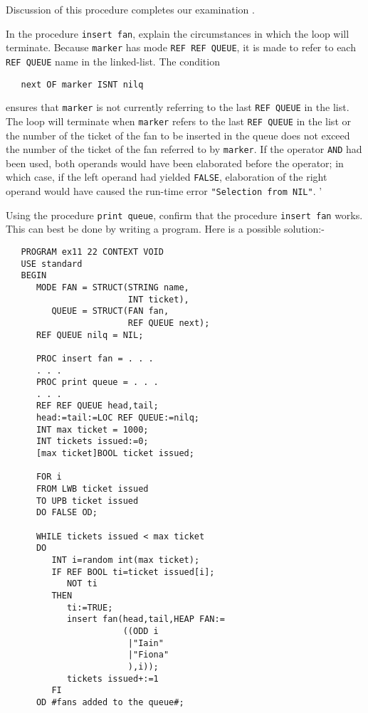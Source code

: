 Discussion of this procedure completes our examination
 .
\begin{exercise}
\item In the procedure \verb|insert fan|, explain the circumstances
in which the loop will terminate. \ans Because \verb|marker| has mode
\verb|REF REF QUEUE|, it is made to refer to each \verb|REF QUEUE|
name in the linked-list. The condition
\begin{verbatim}
   next OF marker ISNT nilq
\end{verbatim}
\noindent
ensures that \verb|marker| is not currently referring to the last
\verb|REF QUEUE| in the list. The loop will terminate when
\verb|marker| refers to the last \verb|REF QUEUE| in the list or the
number of the ticket of the fan to be inserted in the queue does not
exceed the number of the ticket of the fan referred to by
\verb|marker|.
\medskip
If the operator \verb|AND| had been used, both operands would have been
elaborated before the operator; in which case, if the left operand
had yielded \verb|FALSE|, elaboration of the right operand would have
caused the run-time error \verb|"Selection from NIL"|.
'
\item Using the procedure \verb|print queue|, confirm that the
procedure \verb|insert fan| works. \ans This can best be done by
writing a program. Here is a possible solution:-
\begin{verbatim}
   PROGRAM ex11 22 CONTEXT VOID
   USE standard
   BEGIN
      MODE FAN = STRUCT(STRING name,
                        INT ticket),
         QUEUE = STRUCT(FAN fan,
                        REF QUEUE next);
      REF QUEUE nilq = NIL;

      PROC insert fan = . . .
      . . .
      PROC print queue = . . .
      . . .
      REF REF QUEUE head,tail;
      head:=tail:=LOC REF QUEUE:=nilq;
      INT max ticket = 1000;
      INT tickets issued:=0;
      [max ticket]BOOL ticket issued;

      FOR i
      FROM LWB ticket issued
      TO UPB ticket issued
      DO FALSE OD;

      WHILE tickets issued < max ticket
      DO
         INT i=random int(max ticket);
         IF REF BOOL ti=ticket issued[i];
            NOT ti
         THEN
            ti:=TRUE;
            insert fan(head,tail,HEAP FAN:=
                       ((ODD i
                        |"Iain"
                        |"Fiona"
                        ),i));
            tickets issued+:=1
         FI
      OD #fans added to the queue#;


\end{verbatim}
\end{exercise}
